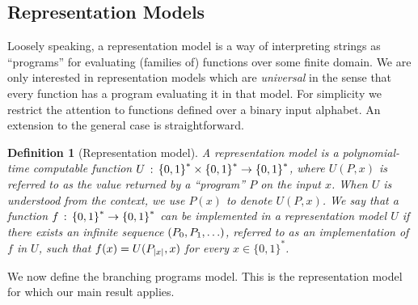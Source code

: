 \documentclass[11pt]{article}
\newtheorem{Example}[theorem]{Example}
\newtheorem{definition}[theorem]{Definition}
\newcommand\bp{\mbox{BP}\xspace}
\newcommand{\mathify}[1]{\ifmmode{#1}\else\mbox{$#1$}\fi}
\newcommand{\set}[2][]{\mathify{{\left\{#2\right\}}^{#1}}}
\newcommand{\bools}[1][]{\set[#1]{0,1}}
\newcommand{\fnrngdom}[2]{#1\to#2}
\newcommand{\fndef}[3]{{#1\,:\,\fnrngdom{#2}{#3}}}
\newcommand{\emptyornot}[3]{\ifthenelse{\equal{#1}{}}{#2}{#3}}
\newcommand{\opbrange}[3][,]{#2#1\ldots#1#3}
\newcommand{\oprrange}[2][,]{#2#1\ldots}
\newcommand{\vars}[3][1]{\emptyornot{#3}{\oprrange[,]{{#2}_{#1}}}{\opbrange[,]{{#2}_{#1}}{{#2}_{#3}}}}
\newcommand{\size}[1]{\mathify{\left| #1 \right|}}
\begin{document}
\subsection{Representation Models}
\label{sec-repdefs}

Loosely speaking, a representation model is a way of interpreting
strings as ``programs'' for evaluating (families of) functions over
some finite domain. We are only interested in representation models
which are {\em universal} in the sense that every function has a
program evaluating it in that model. For simplicity we restrict the
attention to functions defined over a binary input alphabet. An
extension to the general case is straightforward.
%

\begin{definition}[Representation model]
A {\em representation model} is a polynomial-time computable
function $\fndef{U}{\bools[*]\times\bools[*]}{\bools[*]}$, where
$U(P,x)$ is referred to as the value returned by a ``program'' $P$
on the input $x$. When $U$ is understood from the context, we use
$P(x)$ to denote $U(P,x)$.  We say that a function
$\fndef{f}{\bools[*]}{\bools[*]}$ can be implemented in a
representation model $U$ if there exists an infinite sequence
$(P_0,\vars[1]{P}{})$, referred to as an implementation of $f$ in
$U$, such that $f(x) = U(P_{\size{x}},x)$ for every
$x\in\{0,1\}^*$.
\end{definition}

We now define the branching programs model. This is the
representation model for which our main result applies.
\end{document}

